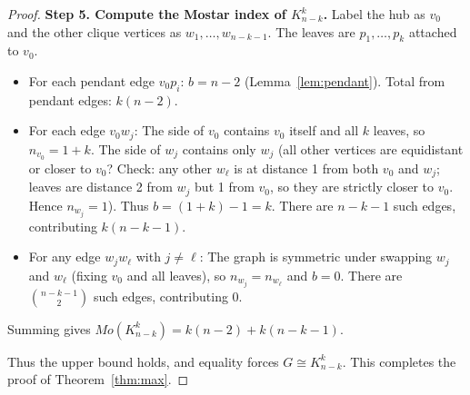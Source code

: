 \documentclass[10pt,a4paper]{amsart}
\begin{document}
\begin{proof}
\textbf{Step 5. Compute the Mostar index of \(K_{n-k}^k\).} Label the hub as \(v_0\) and the other clique vertices as \(w_1,\dots,w_{n-k-1}\). The leaves are \(p_1,\dots,p_k\) attached to \(v_0\). 
\begin{itemize}
\item For each pendant edge \(v_0p_i\): \(b = n-2\) (Lemma~\ref{lem:pendant}). Total from pendant edges: \(k(n-2)\).
\item For each edge \(v_0w_j\): The side of \(v_0\) contains \(v_0\) itself and all \(k\) leaves, so \(n_{v_0}=1+k\). The side of \(w_j\) contains only \(w_j\) (all other vertices are equidistant or closer to \(v_0\)? Check: any other \(w_\ell\) is at distance 1 from both \(v_0\) and \(w_j\); leaves are distance 2 from \(w_j\) but 1 from \(v_0\), so they are strictly closer to \(v_0\). Hence \(n_{w_j}=1\)). Thus \(b = (1+k)-1 = k\). There are \(n-k-1\) such edges, contributing \(k(n-k-1)\).
\item For any edge \(w_j w_\ell\) with \(j\neq\ell\): The graph is symmetric under swapping \(w_j\) and \(w_\ell\) (fixing \(v_0\) and all leaves), so \(n_{w_j}=n_{w_\ell}\) and \(b=0\). There are \(\binom{n-k-1}{2}\) such edges, contributing 0.
\end{itemize}
Summing gives \(Mo(K_{n-k}^k)=k(n-2)+k(n-k-1)\).

Thus the upper bound holds, and equality forces \(G\cong K_{n-k}^k\). This completes the proof of Theorem~\ref{thm:max}.
\end{proof}
\end{document}
